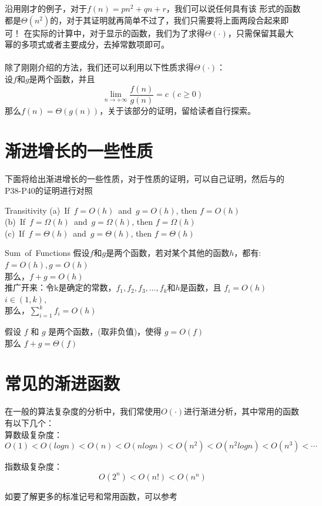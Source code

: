 沿用刚才的例子，对于$f(n)=pn^2+qn+r$，我们可以说任何具有该
形式的函数都是$\Theta(n^2)$的，对于其证明就再简单不过了，我们只需要将上面两段合起来即可！
在实际的计算中，对于显示的函数，我们为了求得$\Theta(\cdot)$，只需保留其最大幂的多项式或者主要成分，去掉常数项即可。
\\
\\
除了刚刚介绍的方法，我们还可以利用以下性质求得$\Theta(\cdot)$：
\\
设$f$和$g$是两个函数，并且
\[
   \lim_{n\rightarrow+\infty}\frac{f(n)}{g(n)} = c \ (c\ge 0)
\]
那么$f(n)=\Theta(g(n))$，关于该部分的证明，留给读者自行探索。


\section{渐进增长的一些性质}
下面将给出渐进增长的一些性质，对于性质的证明，可以自己证明，然后与\cite{textbook1}的P38-P40的证明进行对照
\begin{theorem}{Transitivity}{}
   (a)\ If\ $f=O(h)$\ and\ $g=O(h)$, then $f=O(h)$\\
   (b)\ If\ $f=\Omega(h)$\ and\ $g=\Omega(h)$, then $f=\Omega(h)$\\
   (c)\ If\ $f=\Theta(h)$\ and\ $g=\Theta(h)$, then $f=\Theta(h)$
\end{theorem}

\begin{theorem}{Sum\ of\ Functions}{}
   假设$f$和$g$是两个函数，若对某个其他的函数$h$，都有:$f=O(h),g=O(h)$\\
   那么，$f+g=O(h)$\\
   推广开来：令k是确定的常数，$f_1,f_2,f_3,\ldots,f_k$和$h$是函数，且
   $f_i=O(h)$ \ \ $i\in (1,k)$,\\
   那么，$\sum^{k}_{i=1}f_i=O(h)$
\end{theorem}

\begin{theorem}{ }{}
   假设 $f$ 和 $g$ 是两个函数，(取非负值)，使得 $g = O(f)$ \\
   那么 $f+g=\Theta(f)$
\end{theorem}

\section{常见的渐进函数}
在一般的算法复杂度的分析中，我们常使用$O(\cdot)$进行渐进分析，其中常用的函数有以下几个：\\
算数级复杂度：
\[
O(1)<O(logn)<O(n)<O(nlogn)<O(n^2)<O(n^2logn)<O(n^3)< \cdots
\]

指数级复杂度：
\[
O(2^n)<O(n!)<O(n^n)
\]

如要了解更多的标准记号和常用函数，可以参考~\cite{cormen2009introduction}
